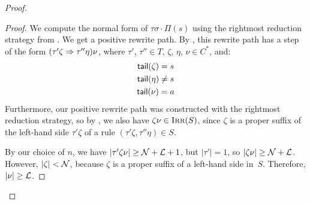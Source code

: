 \documentclass[../generics]{subfiles}
\begin{document}
\begin{proof}
\begin{proof}
We compute the normal form of $\tau \sigma \cdot \Pi(s)$ using the rightmost reduction strategy from . We get a positive rewrite path. By , this rewrite path has a step of the form $( \tau' \zeta \Rightarrow \tau'' \eta ) \nu$, where $\tau'$, $\tau'' \in T$, $\zeta$, $\eta$, $\nu \in C^*$, and:
\begin{gather*}
\mathsf{tail}(\zeta) = s\\
\mathsf{tail}(\eta) \neq s\\
\mathsf{tail}(\nu) = a
\end{gather*}
Furthermore, our positive rewrite path was constructed with the rightmost reduction strategy, so by , we also have $\zeta \nu \in \textsc{Irr}(S)$, since $\zeta$ is a proper suffix of the left-hand side $\tau' \zeta$ of a rule $(\tau' \zeta, \tau'' \eta) \in S$.

By our choice of $n$, we have $|\tau' \zeta \nu| \geq \mathcal{N} + \mathcal{L} + 1$, but $|\tau'| = 1$, so $|\zeta \nu| \geq \mathcal{N} + \mathcal{L}$. However, $|\zeta| < \mathcal{N}$, because $\zeta$ is a proper suffix of a left-hand side in~$S$. Therefore, $|\nu| \geq \mathcal{L}$.


\end{proof}
\end{proof}
\end{document}
